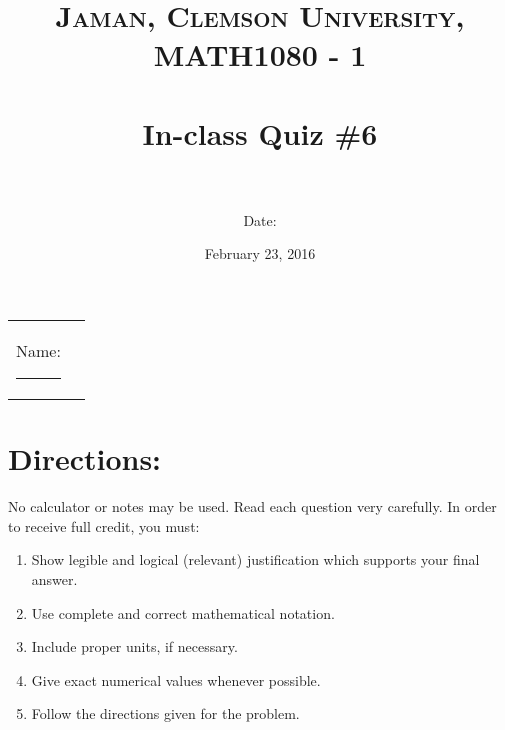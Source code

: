 \documentclass[paper=a4, fontsize=11pt]{scrartcl} %
\title{	
\normalfont \normalsize 
\textsc{Jaman, Clemson University, MATH1080 - 1} \\ [25pt] %
\horrule{0.5pt} \\[0.4cm] %
\huge In-class Quiz \#6 \\ %
\horrule{2pt} \\[0.5cm] %
}
\author{Date:} %
\date{\normalsize February 23, 2016} %
\numberwithin{equation}{section} %
\numberwithin{figure}{section} %
\numberwithin{table}{section} %
\begin{document}
\maketitle %

\begin{flushleft}
\begin{tabular}{l l}
Name: \rule{3.2in}{.01cm}  & {}%
\end{tabular}
\end{flushleft}


\section*{\textbf{Directions:}}

No calculator or notes may be used.  Read each question very carefully.  In order to receive full credit, you must:
\begin{enumerate}
\item Show legible and logical (relevant) justification which supports your final answer.
\item Use complete and correct mathematical notation.
\item Include proper units, if necessary.
\item Give exact numerical values whenever possible.
\item Follow the directions given for the problem.
\end{enumerate}
\vspace{.1in}

\newpage
\end{document}
